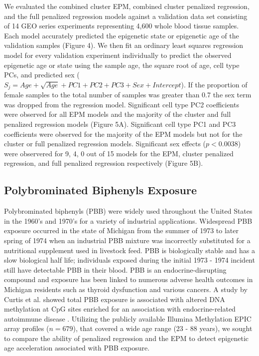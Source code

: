\documentclass{article}
\begin{document}
{\begin{linenumbers}
We evaluated the combined cluster EPM, combined cluster penalized regression, and the full penalized regression models 
against a validation data set consisting of 14 GEO series experiments representing 4,600 whole blood tissue samples. 
Each model accurately predicted the epigenetic state or epigenetic age of the validation samples (Figure 4). We then 
fit an ordinary least squares regression model for every validation experiment individually to predict the observed 
epigenetic age or state using the sample age, the square root of age, cell type PCs, and predicted sex 
($S_j  = Age + \sqrt{Age} + PC1 + PC2 + PC3 + Sex + Intercept$). If the proportion of female samples to the total 
number of samples was greater than 0.7 the sex term was dropped from the regression model. Significant cell type 
PC2 coefficients were observed for all EPM models and the majority of the cluster and full penalized regression 
models (Figure 5A). Significant cell type PC1 and PC3 coefficients were observed for the majority of the EPM models 
but not for the cluster or full penalized regression models. Significant sex effects ($p < 0.0038$) were 
observered for 9, 4, 0 out of 15 models for the EPM, cluster penalized regression, and full penalized regression 
respectively (Figure 5B). 

\subsection{Polybrominated Biphenyls Exposure}

Polybrominated biphenyls (PBB) were widely used throughout the United States in the 1960’s and 1970’s for a variety of 
industrial applications. Widespread PBB exposure occurred in the state of Michigan from the summer of 1973 to later 
spring of 1974 when an industrial PBB mixture was incorrectly substituted for a nutritional supplement used in livestock 
feed\cite{Fries1985-nf}. PBB is biologically stable and has a slow biological half life; individuals exposed during the 
initial 1973 - 1974 incident still have detectable PBB in their blood\cite{Safe1984-sz}. PBB is an endocrine-disrupting 
compound and exposure has been linked to numerous adverse health outcomes in Michigan residents such as thyroid 
dysfunction\cite{Jacobson2017-yi,Curtis2019-mv} and various cancers\cite{Terrell2016-yw,Hoque1998-so}. A study by 
Curtis et al. showed total PBB exposure is associated with altered DNA methylation at CpG sites enriched for an 
association with endocrine-related autoimmune disease \cite{Curtis2019-gz}. Utilizing the publicly available 
Illumina Methylation EPIC array \cite{Pidsley2016-bg}  profiles ($n=679$), that covered a wide age range 
(23 - 88 years), we sought to compare the ability of penalized regression and the EPM to detect epigenetic age 
acceleration associated with PBB exposure. 


\end{linenumbers}}
\end{document}

